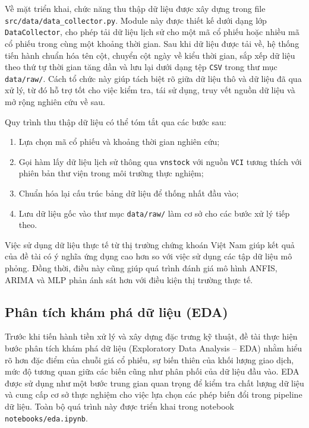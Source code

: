 Về mặt triển khai, chức năng thu thập dữ liệu được xây dựng trong file \texttt{src/data/data\_collector.py}. Module này được thiết kế dưới dạng lớp \texttt{DataCollector}, cho phép tải dữ liệu lịch sử cho một mã cổ phiếu hoặc nhiều mã cổ phiếu trong cùng một khoảng thời gian. Sau khi dữ liệu được tải về, hệ thống tiến hành chuẩn hóa tên cột, chuyển cột ngày về kiểu thời gian, sắp xếp dữ liệu theo thứ tự thời gian tăng dần và lưu lại dưới dạng tệp \texttt{CSV} trong thư mục \texttt{data/raw/}. Cách tổ chức này giúp tách biệt rõ giữa dữ liệu thô và dữ liệu đã qua xử lý, từ đó hỗ trợ tốt cho việc kiểm tra, tái sử dụng, truy vết nguồn dữ liệu và mở rộng nghiên cứu về sau.

Quy trình thu thập dữ liệu có thể tóm tắt qua các bước sau:
\begin{enumerate}
    \item Lựa chọn mã cổ phiếu và khoảng thời gian nghiên cứu;
    \item Gọi hàm lấy dữ liệu lịch sử thông qua \texttt{vnstock} với nguồn \texttt{VCI} tương thích với phiên bản thư viện trong môi trường thực nghiệm;
    \item Chuẩn hóa lại cấu trúc bảng dữ liệu để thống nhất đầu vào;
    \item Lưu dữ liệu gốc vào thư mục \texttt{data/raw/} làm cơ sở cho các bước xử lý tiếp theo.
\end{enumerate}

Việc sử dụng dữ liệu thực tế từ thị trường chứng khoán Việt Nam giúp kết quả của đề tài có ý nghĩa ứng dụng cao hơn so với việc sử dụng các tập dữ liệu mô phỏng. Đồng thời, điều này cũng giúp quá trình đánh giá mô hình ANFIS, ARIMA và MLP phản ánh sát hơn với điều kiện thị trường thực tế.

\subsection{Phân tích khám phá dữ liệu (EDA)}

Trước khi tiến hành tiền xử lý và xây dựng đặc trưng kỹ thuật, đề tài thực hiện bước phân tích khám phá dữ liệu (Exploratory Data Analysis -- EDA) nhằm hiểu rõ hơn đặc điểm của chuỗi giá cổ phiếu, sự biến thiên của khối lượng giao dịch, mức độ tương quan giữa các biến cũng như phân phối của dữ liệu đầu vào. EDA được sử dụng như một bước trung gian quan trọng để kiểm tra chất lượng dữ liệu và cung cấp cơ sở thực nghiệm cho việc lựa chọn các phép biến đổi trong pipeline dữ liệu. Toàn bộ quá trình này được triển khai trong notebook \texttt{notebooks/eda.ipynb}.

